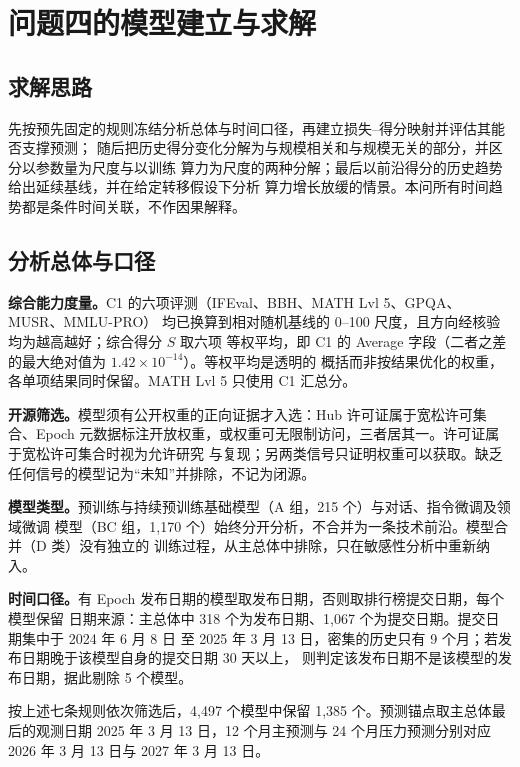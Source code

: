 \section{问题四的模型建立与求解}

\subsection{求解思路}

先按预先固定的规则冻结分析总体与时间口径，再建立损失–得分映射并评估其能否支撑预测；
随后把历史得分变化分解为与规模相关和与规模无关的部分，并区分以参数量为尺度与以训练
算力为尺度的两种分解；最后以前沿得分的历史趋势给出延续基线，并在给定转移假设下分析
算力增长放缓的情景。本问所有时间趋势都是条件时间关联，不作因果解释。

\subsection{分析总体与口径}

\textbf{综合能力度量。}C1 的六项评测（IFEval、BBH、MATH Lvl 5、GPQA、MUSR、MMLU-PRO）
均已换算到相对随机基线的 0--100 尺度，且方向经核验均为越高越好；综合得分 $S$ 取六项
等权平均，即 C1 的 Average 字段（二者之差的最大绝对值为 $1.42\times10^{-14}$）。等权平均是透明的
概括而非按结果优化的权重，各单项结果同时保留。MATH Lvl 5 只使用 C1 汇总分。

\textbf{开源筛选。}模型须有公开权重的正向证据才入选：Hub 许可证属于宽松许可集合、Epoch
元数据标注开放权重，或权重可无限制访问，三者居其一。许可证属于宽松许可集合时视为允许研究
与复现；另两类信号只证明权重可以获取。缺乏任何信号的模型记为“未知”并排除，不记为闭源。

\textbf{模型类型。}预训练与持续预训练基础模型（A 组，215 个）与对话、指令微调及领域微调
模型（BC 组，1,170 个）始终分开分析，不合并为一条技术前沿。模型合并（D 类）没有独立的
训练过程，从主总体中排除，只在敏感性分析中重新纳入。

\textbf{时间口径。}有 Epoch 发布日期的模型取发布日期，否则取排行榜提交日期，每个模型保留
日期来源：主总体中 318 个为发布日期、1,067 个为提交日期。提交日期集中于 2024 年 6 月 8 日
至 2025 年 3 月 13 日，密集的历史只有 9 个月；若发布日期晚于该模型自身的提交日期 30 天以上，
则判定该发布日期不是该模型的发布日期，据此剔除 5 个模型。

按上述七条规则依次筛选后，4,497 个模型中保留 1,385 个。预测锚点取主总体最后的观测日期
2025 年 3 月 13 日，12 个月主预测与 24 个月压力预测分别对应 2026 年 3 月 13 日与 2027 年
3 月 13 日。


